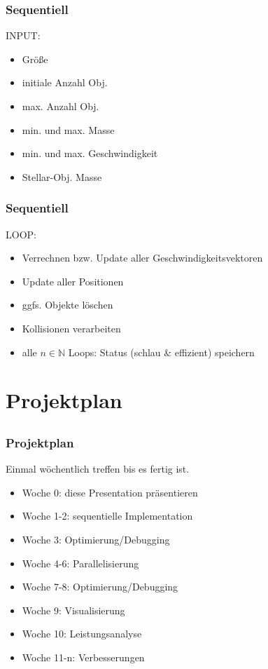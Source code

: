 \documentclass{beamer}
\begin{document}

\begin{frame}
    \frametitle{Sequentiell}
    INPUT:
        \begin{itemize}
            \item Größe
            \item initiale Anzahl Obj.
            \item max. Anzahl Obj.
            \item min. und max. Masse
            \item min. und max. Geschwindigkeit
            \item Stellar-Obj. Masse
        \end{itemize}
\end{frame}


\begin{frame}
    \frametitle{Sequentiell}
    LOOP:
        \begin{itemize}
            \item Verrechnen bzw. Update aller Geschwindigkeitsvektoren
            \item Update aller Positionen
            \item ggfs. Objekte löschen
            \item Kollisionen verarbeiten
            \item alle $n \in \mathbb{N}$ Loops: Status (schlau \& effizient) speichern
        \end{itemize}

\end{frame}


\section{Projektplan}
\subsection{}


\begin{frame}
    \frametitle{Projektplan}
    Einmal wöchentlich treffen bis es fertig ist.
    \begin{itemize}
        \item Woche 0: diese Presentation präsentieren
        \item Woche 1-2: sequentielle Implementation
        \item Woche 3: Optimierung/Debugging
        \item Woche 4-6: Parallelisierung
        \item Woche 7-8: Optimierung/Debugging
        \item Woche 9: Visualisierung
        \item Woche 10: Leistungsanalyse
        \item Woche 11-n: Verbesserungen
    \end{itemize}
\end{frame}
\end{document}
